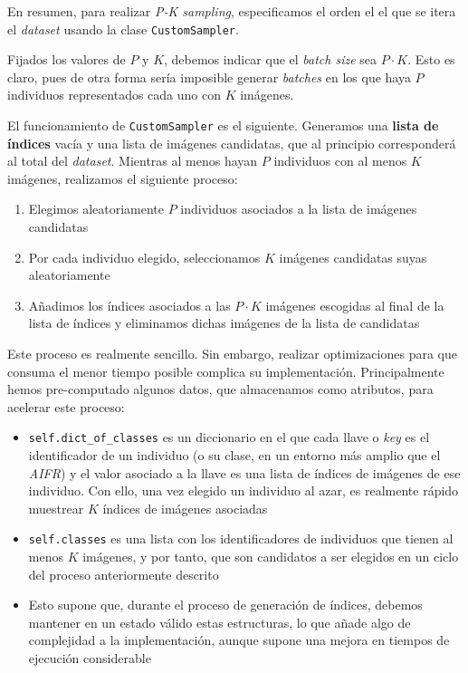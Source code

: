 En resumen, para realizar \textit{P-K sampling}, especificamos el orden el el que se itera el \textit{dataset} usando la clase \lstinline{CustomSampler}.

Fijados los valores de $P$ y $K$, debemos indicar que el \textit{batch size} sea $P \cdot K$. Esto es claro, pues de otra forma sería imposible generar \textit{batches} en los que haya $P$ individuos representados cada uno con $K$ imágenes.

El funcionamiento de \lstinline{CustomSampler} es el siguiente. Generamos una \textbf{lista de índices} vacía y una lista de imágenes candidatas, que al principio corresponderá al total del \textit{dataset}. Mientras al menos hayan $P$ individuos con al menos $K$ imágenes, realizamos el siguiente proceso:

\begin{enumerate}
    \item Elegimos aleatoriamente $P$ individuos asociados a la lista de imágenes candidatas
    \item Por cada individuo elegido, seleccionamos $K$ imágenes candidatas suyas aleatoriamente
    \item Añadimos los índices asociados a las $P \cdot K$ imágenes escogidas al final de la lista de índices y eliminamos dichas imágenes de la lista de candidatas
\end{enumerate}

Este proceso es realmente sencillo. Sin embargo, realizar optimizaciones para que consuma el menor tiempo posible complica su implementación. Principalmente hemos pre-computado algunos datos, que almacenamos como atributos, para acelerar este proceso:

\begin{itemize}
    \item \lstinline{self.dict_of_classes} es un diccionario en el que cada llave o \textit{key} es el identificador de un individuo (o su clase, en un entorno más amplio que el \textit{AIFR}) y el valor asociado a la llave es una lista de índices de imágenes de ese individuo. Con ello, una vez elegido un individuo al azar, es realmente rápido muestrear $K$ índices de imágenes asociadas
    \item \lstinline{self.classes} es una lista con los identificadores de individuos que tienen al menos $K$ imágenes, y por tanto, que son candidatos a ser elegidos en un ciclo del proceso anteriormente descrito
    \item Esto supone que, durante el proceso de generación de índices, debemos mantener en un estado válido estas estructuras, lo que añade algo de complejidad a la implementación, aunque supone una mejora en tiempos de ejecución considerable
\end{itemize}

